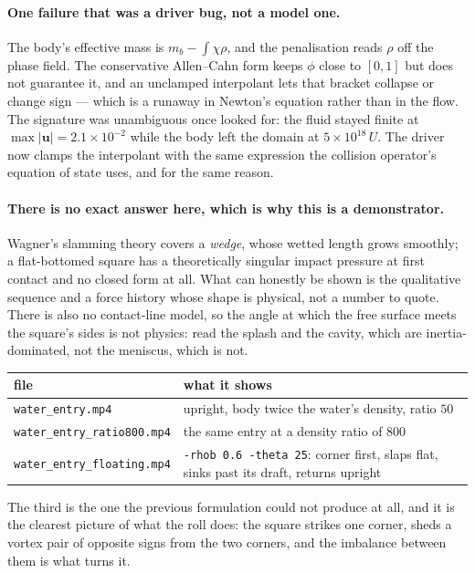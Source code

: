 \documentclass[11pt,a4paper]{article}
\newcommand{\code}[1]{\texttt{\small #1}}
\newcommand{\uu}{\bm{u}}
\newcommand{\e}[1]{\times 10^{#1}}
\begin{document}
\paragraph{One failure that was a driver bug, not a model one.} The body's
effective mass is $m_b - \int\chi\rho$, and the penalisation reads $\rho$ off the
phase field. The conservative Allen--Cahn form keeps $\phi$ close to $[0,1]$ but
does not guarantee it, and an unclamped interpolant lets that bracket collapse or
change sign --- which is a runaway in Newton's equation rather than in the flow.
The signature was unambiguous once looked for: the fluid stayed finite at
$\max|\uu| = 2.1\e{-2}$ while the body left the domain at $5\e{18}\,U$. The
driver now clamps the interpolant with the same expression the collision
operator's equation of state uses, and for the same reason.

\paragraph{There is no exact answer here, which is why this is a demonstrator.}
Wagner's slamming theory covers a \emph{wedge}, whose wetted length grows
smoothly; a flat-bottomed square has a theoretically singular impact pressure at
first contact and no closed form at all. What can honestly be shown is the
qualitative sequence and a force history whose shape is physical, not a number
to quote. There is also no contact-line model, so the angle at which the free
surface meets the square's sides is not physics: read the splash and the cavity,
which are inertia-dominated, not the meniscus, which is not.

\begin{center}\small
\begin{tabular}{@{}l@{\quad}p{}@{}}
\toprule
file & what it shows \\
\midrule
\code{water\_entry.mp4}          & upright, body twice the water's density, ratio $50$ \\
\code{water\_entry\_ratio800.mp4} & the same entry at a density ratio of $800$ \\
\code{water\_entry\_floating.mp4} & \code{-rhob 0.6 -theta 25}: corner first, slaps flat, sinks past its draft, returns upright \\
\bottomrule
\end{tabular}
\end{center}

The third is the one the previous formulation could not produce at all, and it
is the clearest picture of what the roll does: the square strikes one corner,
sheds a vortex pair of opposite signs from the two corners, and the imbalance
between them is what turns it.
\end{document}
